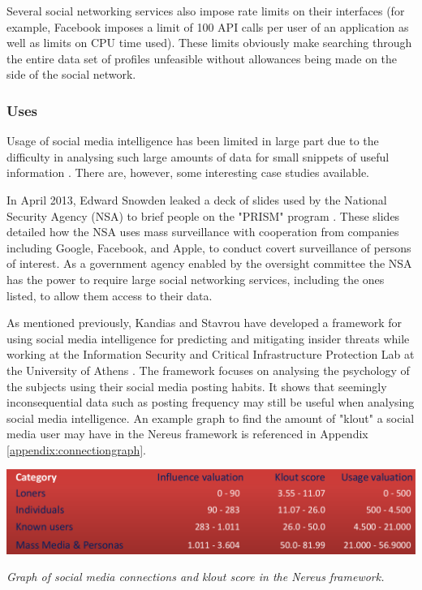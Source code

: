 \documentclass[12pt]{article}
\begin{document}
Several social networking services also impose rate limits on their interfaces (for example, Facebook imposes a limit of 100 API calls per user of an application as well as limits on CPU time used). These limits obviously make searching through the entire data set of profiles unfeasible without allowances being made on the side of the social network. 

\subsubsection{Uses}
Usage of social media intelligence has been limited in large part due to the difficulty in analysing such large amounts of data for small snippets of useful information \citep{socmintoverview}. There are, however, some interesting case studies available.

In April 2013, Edward Snowden leaked a deck of slides used by the National Security Agency (NSA) to brief people on the "PRISM" program \citep{prismslides}. These slides detailed how the NSA uses mass surveillance with cooperation from companies including Google, Facebook, and Apple, to conduct covert surveillance of persons of interest. As a government agency enabled by the oversight committee the NSA has the power to require large social networking services, including the ones listed, to allow them access to their data.

As mentioned previously, Kandias and Stavrou have developed a framework for using social media intelligence for predicting and mitigating insider threats while working at the Information Security and Critical Infrastructure Protection Lab at the University of Athens \citep{behaviourdetection}. The framework focuses on analysing the psychology of the subjects using their social media posting habits. It shows that seemingly inconsequential data such as posting frequency may still be useful when analysing social media intelligence. An example graph to find the amount of "klout" a social media user may have in the Nereus framework is referenced in Appendix \ref{appendix:connectiongraph}.

\begin{center}
\includegraphics[width=\linewidth]{res/connection_klout.png}

\textit{Graph of social media connections and klout score in the Nereus framework\citep{behaviourdetection}.}
\end{center}
\end{document}
